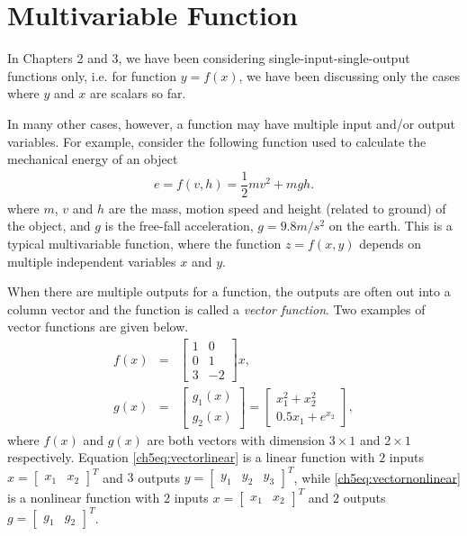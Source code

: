 \section{Multivariable Function} \label{ch5sec:multivarfunction}

In Chapters 2 and 3, we have been considering single-input-single-output functions only, i.e. for function $y=f(x)$, we have been discussing only the cases where $y$ and $x$ are scalars so far.

In many other cases, however, a function may have multiple input and/or output variables. For example, consider the following function used to calculate the mechanical energy of an object
\begin{eqnarray}
    e = f(v, h) = \dfrac{1}{2}mv^2 + mgh. \nonumber
\end{eqnarray}
where $m$, $v$ and $h$ are the mass, motion speed and height (related to ground) of the object, and $g$ is the free-fall acceleration, $g=9.8m/s^2$ on the earth. This is a typical multivariable function, where the function $z=f(x, y)$ depends on multiple independent variables $x$ and $y$.

When there are multiple outputs for a function, the outputs are often out into a column vector and the function is called a \textit{vector function}. Two examples of vector functions are given below.
\begin{eqnarray}
    f(x) &=& \left[\begin{array}{cc}
        1 & 0 \\
        0 & 1 \\
        3 & -2
    \end{array}\right]x, \label{ch5eq:vectorlinear} \\
    g(x) &=& \left[\begin{array}{c}
         g_1(x)  \\
         g_2(x)
    \end{array}\right] = \left[\begin{array}{c}
         x_1^2 + x_2^2  \\
         0.5x_1 + e^{x_2}
    \end{array}\right], \label{ch5eq:vectornonlinear}
\end{eqnarray}
where $f(x)$ and $g(x)$ are both vectors with dimension $3\times 1$ and $2\times 1$ respectively. Equation \eqref{ch5eq:vectorlinear} is a linear function with $2$ inputs $x = \left[\begin{array}{cc}
    x_1 & x_2
\end{array}\right]^T$ and $3$ outputs $y = \left[\begin{array}{ccc}
    y_1 & y_2 & y_3
\end{array}\right]^T$, while \eqref{ch5eq:vectornonlinear} is a nonlinear function with $2$ inputs $x = \left[\begin{array}{cc}
    x_1 & x_2
\end{array}\right]^T$ and $2$ outputs $g = \left[\begin{array}{cc}
    g_1 & g_2
\end{array}\right]^T$.



